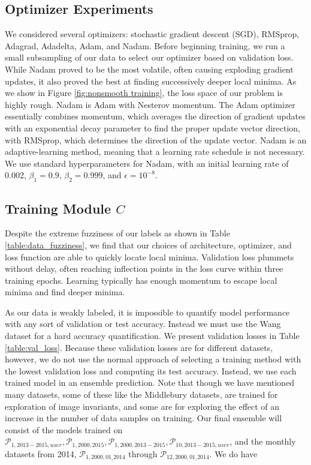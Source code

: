 \subsection{Optimizer Experiments}
We considered several optimizers: stochastic gradient descent (SGD), RMSprop\cite{tieleman2012lecture}, Adagrad\cite{duchi2011adaptive}, Adadelta\cite{zeiler2012adadelta}, Adam\cite{kingma2014adam}, and Nadam\cite{kingma2014adam}. Before beginning training, we run a small subsampling of our data to select our optimizer based on validation loss. While Nadam proved to be the most volatile, often causing exploding gradient updates, it also proved the best at finding successively deeper local minima. As we show in Figure \ref{fig:nonsmooth training}, the loss space of our problem is highly rough. Nadam is Adam with Nesterov momentum. The Adam optimizer essentially combines momentum, which averages the direction of gradient updates with an exponential decay parameter to find the proper update vector direction, with RMSprop, which determines the direction of the update vector. Nadam is an adaptive-learning method, meaning that a learning rate schedule is not necessary. We use standard hyperparameters for Nadam, with an initial learning rate of 0.002, $\beta_1=0.9$, $\beta_2=0.999$, and $\epsilon=10^{-8}$.

\subsection{Training Module $C$}
Despite the extreme fuzziness of our labels as shown in Table \ref{table:data_fuzziness}, we find that our choices of architecture, optimizer, and loss function are able to quickly locate local minima. Validation loss plummets without delay, often reaching inflection points in the loss curve within three training epochs. Learning typically has enough momentum to escape local minima and find deeper minima.

As our data is weakly labeled, it is impossible to quantify model performance with any sort of validation or test accuracy. Instead we must use the Wang dataset for a hard accuracy quantification. We present validation losses in Table \ref{table:val_loss}. Because these validation losses are for different datasets, however, we do not use the normal approach of selecting a training method with the lowest validation loss and computing its test accuracy. Instead, we use each trained model in an ensemble prediction. Note that though we have mentioned many datasets, some of these like the Middlebury datasets, are trained for exploration of image invariants, and some are for exploring the effect of an increase in the number of data samples on training. Our final ensemble will consist of the models trained on $\mathcal{P}_{1,2013-2015,user}, \mathcal{P}_{1,2000,2015}, \mathcal{P}_{1,2000,2013-2015}, \mathcal{P}_{10,2013-2015,user}$, and the monthly datasets from 2014, $\mathcal{P}_{1,2000,01\_2014}$ through $\mathcal{P}_{12,2000,01\_2014}$.  We do have 

